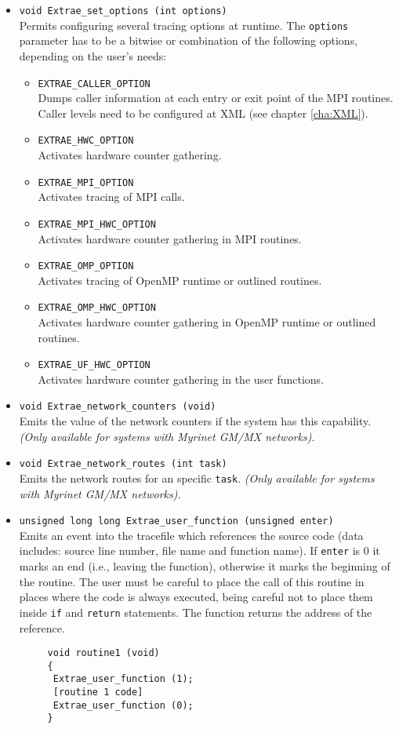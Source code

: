 \begin{itemize}
 \item {\tt void Extrae\_set\_options (int options)}\\
  Permits configuring several tracing options at runtime. The {\tt options} parameter has to be a bitwise or combination of the following options, depending on the user's needs:
  \begin{itemize}
   \item {\tt EXTRAE\_CALLER\_OPTION}\\
    Dumps caller information at each entry or exit point of the MPI routines. Caller levels need to be configured at XML (see chapter \ref{cha:XML}).
   \item {\tt EXTRAE\_HWC\_OPTION}\\
    Activates hardware counter gathering.
   \item {\tt EXTRAE\_MPI\_OPTION}\\
    Activates tracing of MPI calls.
   \item {\tt EXTRAE\_MPI\_HWC\_OPTION}\\
    Activates hardware counter gathering in MPI routines.
   \item {\tt EXTRAE\_OMP\_OPTION}\\
    Activates tracing of OpenMP runtime or outlined routines.
   \item {\tt EXTRAE\_OMP\_HWC\_OPTION}\\
    Activates hardware counter gathering in OpenMP runtime or outlined routines.
   \item {\tt EXTRAE\_UF\_HWC\_OPTION}\\
    Activates hardware counter gathering in the user functions.
  \end{itemize}

 \item {\tt void Extrae\_network\_counters (void)}\\
  Emits the value of the network counters if the system has this capability. {\em (Only available for systems with Myrinet GM/MX networks).}

 \item {\tt void Extrae\_network\_routes (int task)}\\
  Emits the network routes for an specific {\tt task}. {\em (Only available for systems with Myrinet GM/MX networks).}

 \item {\tt unsigned long long Extrae\_user\_function (unsigned enter)}\\
  Emits an event into the tracefile which references the source code (data includes: source line number, file name and function name). If {\tt enter} is 0 it marks an end (i.e., leaving the function), otherwise it marks the beginning of the routine. The user must be careful to place the call of this routine in places where the code is always executed, being careful not to place them inside {\tt if} and {\tt return} statements. The function returns the address of the reference.
    \begin{verbatim}
     void routine1 (void)
     {
      Extrae_user_function (1);
      [routine 1 code]
      Extrae_user_function (0);
     }


\end{verbatim}
\end{itemize}
